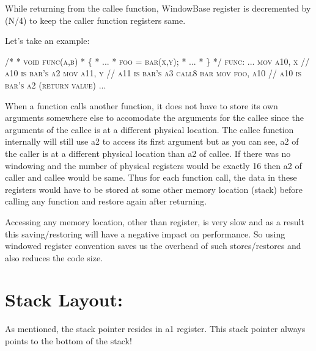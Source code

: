 While returning from the callee function, WindowBase register is decremented by (N/4) to keep the caller function registers same.

Let’s take an example:

\begin{tcolorbox}
\textsc{    /*\newline}
\textsc{	* void func(a,b)\newline}
\textsc{	* \{\newline}
\textsc{		*     ...\newline}
\textsc{		*     foo = bar(x,y);\newline}
\textsc{		*     ...\newline}
\textsc{		* \}\newline}
\textsc{	*/	\newline}
\textsc{		func:\newline}
\textsc{		...\newline}
\textsc{		mov         a10, x    // a10 is bar’s a2\newline}
\textsc{		mov         a11, y    // a11 is bar’s a3\newline}
\textsc{		call8       bar	\newline}
\textsc{		mov         foo, a10  // a10 is bar’s a2 (return value)\newline}
\textsc{		...}
\end{tcolorbox}

 When a function calls another function, it does not have to store its own arguments somewhere else to accomodate the arguments for the callee since the arguments of the callee is at a different physical location. The callee function internally will still use a2 to access its first argument but as you can see, a2 of the caller is at a different physical location than a2 of callee. If there was no windowing and the number of physical registers would be exactly 16 then a2 of caller and callee would be same. Thus for each function call, the data in these registers would have to be stored at some other memory location (stack) before calling any function and restore again after returning.

Accessing any memory location, other than register, is very slow and as a result this saving/restoring will have a negative impact on performance. So using windowed register convention saves us the overhead of such stores/restores and also reduces the code size.

\section*{Stack Layout:}
As mentioned, the stack pointer resides in a1 register. This stack pointer always points to the bottom of the stack!

